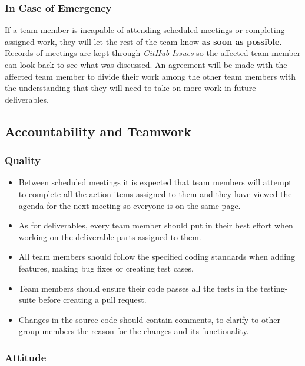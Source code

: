 \documentclass{article}
\begin{document}
\subsubsection*{In Case of Emergency}

If a team member is incapable of attending scheduled meetings or completing assigned work, they will let the rest of the team know \textbf{as soon as possible}. Records of meetings are kept through \textit{GitHub Issues} so the affected team member can look back to see what was discussed. An agreement will be made with the affected team member to divide their work among the other team members with the understanding that they will need to take on more work in future deliverables.

\pagebreak

\subsection*{Accountability and Teamwork}

\subsubsection*{Quality}

\begin{itemize}
    \item Between scheduled meetings it is expected that team members will attempt to complete all the action items assigned to them and they have viewed the agenda for the next meeting so everyone is on the same page.
    \item As for deliverables, every team member should put in their best effort when working on the deliverable parts assigned to them.
    \item All team members should follow the specified coding standards when adding features, making bug fixes or creating test cases.
    \item Team members should ensure their code passes all the tests in the testing-suite before creating a pull request.
    \item Changes in the source code should contain comments, to clarify to other group members the reason for the changes and its functionality.
\end{itemize}

\subsubsection*{Attitude}
\end{document}
